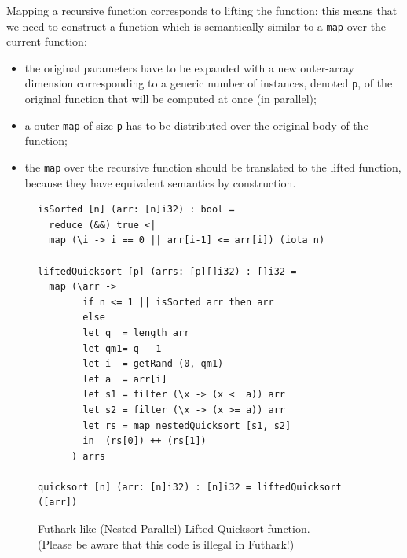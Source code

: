 \documentclass[acmsmall,review]{acmart}\settopmatter{printfolios=true,printccs=false,printacmref=false}
\begin{document}
Mapping a recursive function corresponds to lifting the function:
this means that we need to construct a function which is semantically
similar to a \lstinline{map} over the current function:
\begin{itemize}
    \item the original parameters have to be expanded with
        a new outer-array dimension corresponding to a generic
        number of instances, denoted {\tt p}, of the original
        function that will be computed at once (in parallel);
    \item a outer \lstinline{map} of size {\tt p} has to be
        distributed over the original body of the function;
    \item the \lstinline{map} over the recursive function
        should be translated to the lifted function, because
        they have equivalent semantics by construction.
\end{itemize}

\begin{figure}
\begin{lstlisting}[mathescape=true]
isSorted [n] (arr: [n]i32) : bool =
  reduce (&&) true <|
  map (\i -> i == 0 || arr[i-1] <= arr[i]) (iota n)

liftedQuicksort [p] (arrs: [p][]i32) : []i32 =
  map (\arr ->
        if n <= 1 || isSorted arr then arr
        else
        let q  = length arr
        let qm1= q - 1
        let i  = getRand (0, qm1)
        let a  = arr[i]
        let s1 = filter (\x -> (x <  a)) arr
        let s2 = filter (\x -> (x >= a)) arr
        let rs = map nestedQuicksort [s1, s2]
        in  (rs[0]) ++ (rs[1])
      ) arrs

quicksort [n] (arr: [n]i32) : [n]i32 = liftedQuicksort ([arr]) 
\end{lstlisting}\vspace{-4ex}
\caption{Futhark-like (Nested-Parallel) Lifted Quicksort function.\\
        (Please be aware that this code is illegal in Futhark!)}
\label{fig:lifted-nest-par-quicksort-Futhark}
\end{figure}
\end{document}
